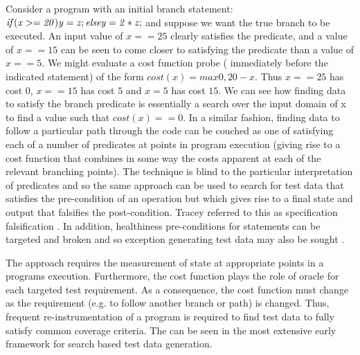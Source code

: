 Consider a program with an initial branch statement: ${\it{ if (x >= 20) y = z; else y = 2 * z;}}$ and suppose we want the true branch to be executed. An input value of $x == 25$ clearly satisfies the predicate, and a value of $x == 15$ can be seen to come closer to satisfying the predicate than a value of $x ==5$. We might evaluate a cost function probe ( immediately before the indicated statement) of the form $cost(x) = max {0, 20 - x}$. Thus $x == 25$ has cost $0$, $x == 15$ has cost $5$ and $x = 5$ has cost $15$. We can see how finding data to satisfy the branch predicate is essentially a search over the input domain of x to find a value such that $cost(x) == 0$. In a similar fashion, finding data to follow a particular path through the code can be couched as one of satisfying each of a number of predicates at points in program execution (giving rise to a cost function that combines in some way the costs apparent at each of the relevant branching points).  The technique is blind to the particular interpretation of predicates and so the same approach can be used to search for test data that satisfies the pre-condition of an operation but which gives rise to a final state and output that falsifies the post-condition. Tracey referred to this as specification falsification \cite{tracey1998automated}. In addition, healthiness pre-conditions for statements can be targeted and broken and so exception generating test data may also be sought \cite{tracey2000automated}. 

The approach requires the measurement of state at appropriate points in a programs execution. Furthermore, the cost function plays the role of oracle for each targeted test requirement. As a consequence, the cost function must change as the requirement (e.g. to follow another branch or path) is changed. Thus, frequent re-instrumentation of a program is required to find test data to fully satisfy common coverage criteria. The can be seen in the most extensive early framework for search based test data generation.







